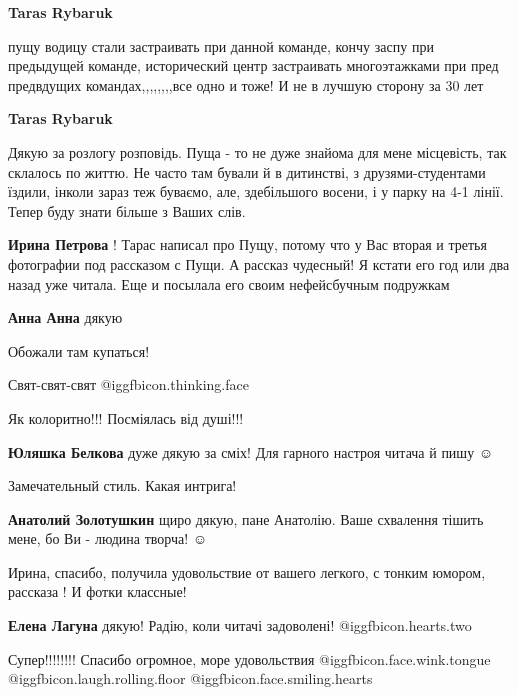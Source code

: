 \begin{itemize}
\begin{itemize} %
\textbf{Taras Rybaruk} 

пущу водицу стали застраивать при данной команде, кончу заспу при предыдущей
команде, исторический центр застраивать многоэтажками при пред предвдущих
командах,,,,,,,,все одно и тоже! И не в лучшую сторону за 30 лет


\textbf{Taras Rybaruk} 

Дякую за розлогу розповідь. Пуща - то не дуже знайома для мене місцевість, так
склалось по життю. Не часто там бували й в дитинстві, з друзями-студентами
їздили, інколи зараз теж буваємо, але, здебільшого восени, і у парку на 4-1
лінії. Тепер буду знати більше з Ваших слів.

\begin{itemize} %
\textbf{Ирина Петрова} ! Тарас написал про Пущу, потому что у Вас вторая и третья фотографии под рассказом с Пущи.
А рассказ чудесный! Я кстати его год или два назад уже читала. Еще и посылала его своим нефейсбучным подружкам

\textbf{Анна Анна} дякую
\end{itemize} %

\end{itemize} %

Обожали там купаться!

Свят-свят-свят @igg{fbicon.thinking.face} 

Як колоритно!!! Посміялась від душі!!!

\textbf{Юляшка Белкова} дуже дякую за сміх! Для гарного настроя читача й пишу ☺ ️ 

Замечательный стиль. Какая интрига!

\textbf{Анатолий Золотушкин} щиро дякую, пане Анатолію. Ваше схвалення тішить мене, бо Ви - людина творча!  ☺ ️ 

Ирина, спасибо, получила удовольствие от вашего легкого, с тонким юмором, рассказа ! И фотки классные!

\textbf{Елена Лагуна} дякую! Радію, коли читачі задоволені! @igg{fbicon.hearts.two} 

Супер!!!!!!!! Спасибо огромное, море удовольствия @igg{fbicon.face.wink.tongue}  @igg{fbicon.laugh.rolling.floor}  @igg{fbicon.face.smiling.hearts} 


\end{itemize}
